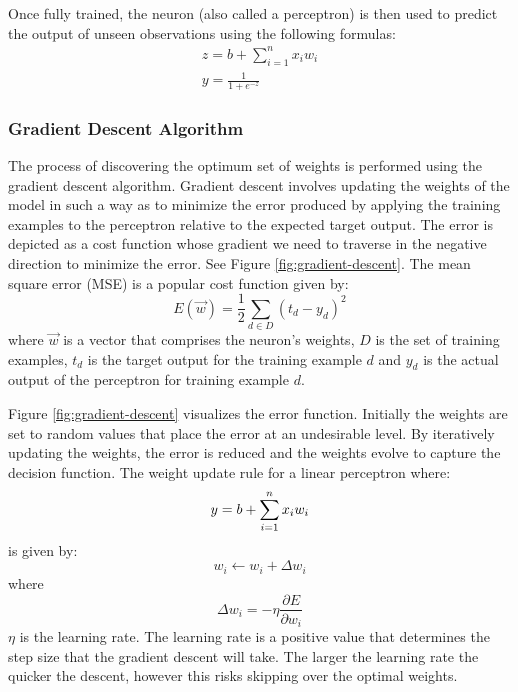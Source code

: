 Once fully trained, the neuron (also called a perceptron) is then used to predict the output of unseen observations using the following formulas:
\begin{gather}
\label{eq:sigmoid}
	z = b + \sum\limits_{i=1}^n x_i w_i\\
	y = \frac{1}{1+e^{-z}}
\end{gather}

\subsubsection{Gradient Descent Algorithm}

The process of discovering the optimum set of weights is performed using the gradient descent algorithm. Gradient descent involves updating the weights of the model in such a way as to minimize the error produced by  applying the training examples to the perceptron relative to the expected target output. The error is depicted as a cost function whose gradient we need to traverse in the negative direction to minimize the error. See Figure \ref{fig:gradient-descent}\cite{Le15atutorial}. The mean square error (MSE) is a popular cost function\cite{Mitchell} given by:
\begin{equation}
E(\vec{w}) = \frac{1}{2} \sum_{d \in D} (t_d - y_d)^2
\end{equation}
where $\vec{w}$ is a vector that comprises the neuron's weights, $D$ is the set of training examples, $t_d$ is the target output for the training example $d$ and $y_d$ is the actual output of the perceptron for training example $d$. 

Figure \ref{fig:gradient-descent} visualizes the error function. Initially the weights are set to random values that place the error at an undesirable level. By iteratively updating the weights, the error is reduced and the weights evolve to capture the decision function. The weight update rule for a linear perceptron where:
\begin{equation}
	y = b + \sum\limits_{i=1}^n x_i w_i\\
\end{equation}
is given by:
\begin{equation}
w_i \leftarrow w_i + \Delta w_i
\end{equation}
where
\begin{equation}
\Delta w_i = -\eta \frac{\partial E}{\partial w_i}
\end{equation}
$\eta$ is the learning rate. The learning rate is a positive value that determines the step size that the gradient descent will take. The larger the learning rate the quicker the descent, however this risks skipping over the optimal weights.

